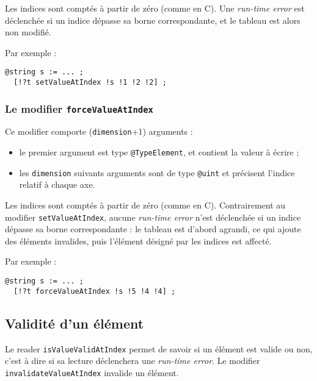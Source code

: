 Les indices sont comptés à partir de zéro (comme en C). Une \emph{run-time error} est déclenchée si un indice dépasse sa borne correspondante, et le tableau est alors non modifié.

Par exemple :
\begin{lstlisting}[language=galgas]
  @string s := ... ;
  [!?t setValueAtIndex !s !1 !2 !2] ;
\end{lstlisting}





\subsubsection{Le modifier \lstinline[language=galgas]!forceValueAtIndex!}

Ce modifier comporte (\lstinline[language=galgas]!dimension!+1) arguments :
\begin{itemize}
  \item le premier argument est type \lstinline[language=galgas]!@TypeElement!, et contient la valeur à écrire ;
  \item les \lstinline[language=galgas]!dimension! suivants arguments sont de type \lstinline[language=galgas]!@uint! et précisent l'indice relatif à chaque axe.
\end{itemize} 
  
Les indices sont comptés à partir de zéro (comme en C). Contrairement au modifier \lstinline[language=galgas]!setValueAtIndex!, aucune \emph{run-time error} n'est déclenchée si un indice dépasse sa borne correspondante : le tableau est d'abord agrandi, ce qui ajoute des éléments invalides, puis l'élément désigné par les indices est affecté.

Par exemple :
\begin{lstlisting}[language=galgas]
  @string s := ... ;
  [!?t forceValueAtIndex !s !5 !4 !4] ;
\end{lstlisting}





\subsection{Validité d'un élément}

Le reader \lstinline[language=galgas]!isValueValidAtIndex! permet de savoir si un élément est valide ou non, c'est à dire si sa lecture déclenchera une \emph{run-time error}. Le modifier \lstinline[language=galgas]!invalidateValueAtIndex! invalide un élément.

